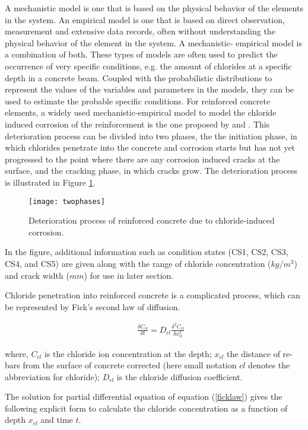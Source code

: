 \documentclass[Journal]{ascelike}
\begin{document}
A mechanistic model is one that is based on the physical behavior
of the elements in the system. An empirical model is one that is based
on direct observation, measurement and extensive data records, often
without understanding the physical behavior of the element in the
system. A mechanistic- empirical model is a combination of both. These
types of models are often used to predict the occurrence of very specific
conditions, e.g. the amount of chlorides at a specific depth in a
concrete beam. Coupled with the probabilistic distributions to represent
the values of the variables and parameters in the models, they can
be used to estimate the probable specific conditions. For reinforced
concrete elements, a widely used mechanistic-empirical model to model
the chloride induced corrosion of the reinforcement is the one proposed
by  and . This deterioration
process can be divided into two phases, the the initiation phase,
in which chlorides penetrate into the concrete and corrosion starts
but has not yet progressed to the point where there are any corrosion
induced cracks at the surface, and the cracking phase, in which cracks
grow. The deterioration process is illustrated in Figure \ref{fig1}.

\begin{figure}[h!]
\centering \texttt{[image: twophases]} \caption{Deterioration process of reinforced concrete due to chloride-induced corrosion.}
\label{fig1} 
\end{figure}

In the figure, additional information such as condition states (CS1,
CS2, CS3, CS4, and CS5) are given along with the range of chloride
concentration ($kg/m^{3}$) and crack width ($mm$) for use in later
section.

Chloride penetration into reinforced concrete is a complicated process,
which can be represented by Fick's second law of diffusion.

\begin{eqnarray}
 &  & \frac{\delta C_{cl}}{\delta t}=D_{cl}\frac{\delta^{2}C_{cl}}{\delta x_{cl}^{2}}\label{ficklaw}
\end{eqnarray}

where, $C_{cl}$ is the chloride ion concentration at the depth; $x_{cl}$
the distance of re-bars from the surface of concrete corrected (here
small notation $cl$ denotes the abbreviation for chloride); $D_{cl}$
is the chloride diffusion coefficient.

The solution for partial differential equation of equation (\ref{ficklaw})
gives the following explicit form to calculate the chloride concentration
as a function of depth $x_{cl}$ and time $t$.
\end{document}
